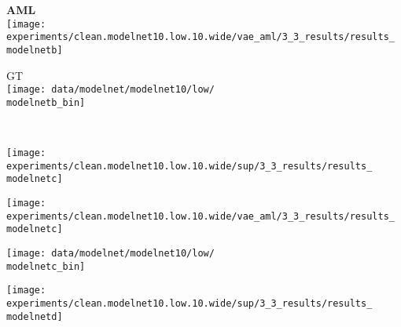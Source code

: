 {\begin{minipage}[t]{0.97\textwidth}
    \begin{minipage}[t]{0.145\textwidth}
        \vspace{0px}\centering
        {\bf\color{MPIIorange} AML}\\[-1px]
        \texttt{[image: experiments/clean.modelnet10.low.10.wide/vae\_aml/3\_3\_results/results\_\\modelnetb]}
    \end{minipage}
    \begin{minipage}[t]{0.145\textwidth}
        \vspace{0px}\centering
        GT\\[-1px]
        \texttt{[image: data/modelnet/modelnet10/low/\\modelnetb\_bin]}
    \end{minipage}
    \\
    \begin{minipage}[t]{0.145\textwidth}
        \vspace{0px}\centering
        \texttt{[image: experiments/clean.modelnet10.low.10.wide/sup/3\_3\_results/results\_\\modelnetc]}
    \end{minipage}
    \begin{minipage}[t]{0.145\textwidth}
        \vspace{0px}\centering
        \texttt{[image: experiments/clean.modelnet10.low.10.wide/vae\_aml/3\_3\_results/results\_\\modelnetc]}
    \end{minipage}
    \begin{minipage}[t]{0.145\textwidth}
        \vspace{0px}\centering
        \texttt{[image: data/modelnet/modelnet10/low/\\modelnetc\_bin]}
    \end{minipage}
    \hspace*{2.5mm}
    \begin{minipage}[t]{0.145\textwidth}
        \vspace{0px}\centering
        \texttt{[image: experiments/clean.modelnet10.low.10.wide/sup/3\_3\_results/results\_\\modelnetd]}
    \end{minipage}
    \begin{minipage}[t]{0.145\textwidth}

\end{minipage}
\end{minipage}}
